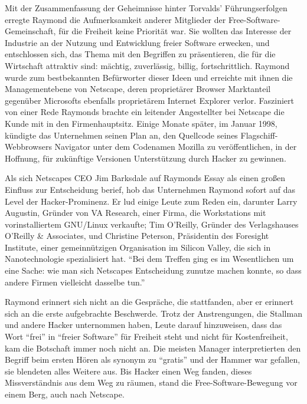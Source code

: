 Mit der Zusammenfassung der Geheimnisse hinter Torvalds' Führungserfolgen erregte Raymond die Aufmerksamkeit anderer Mitglieder der Free-Software-Gemeinschaft, für die Freiheit keine Priorität war. Sie wollten das Interesse der Industrie an der Nutzung und Entwicklung freier Software erwecken, und entschlossen sich, das Thema mit den Begriffen zu präsentieren, die für die Wirtschaft attraktiv sind: mächtig, zuverlässig, billig, fortschrittlich. Raymond wurde zum bestbekannten Befürworter dieser Ideen und erreichte mit ihnen die Managementebene von Netscape, deren proprietärer Browser Marktanteil gegenüber Microsofts ebenfalls proprietärem Internet Explorer verlor. Fasziniert von einer Rede Raymonds brachte ein leitender Angestellter bei Netscape die Kunde mit in den Firmenhauptsitz. Einige Monate später, im Januar 1998, kündigte das Unternehmen seinen Plan an, den Quellcode seines Flagschiff-Webbrowsers Navigator unter dem Codenamen Mozilla zu veröffentlichen, in der Hoffnung, für zukünftige Versionen Unterstützung durch Hacker zu gewinnen.

Als sich Netscapes CEO Jim Barksdale auf Raymonds Essay  als einen großen Einfluss zur Entscheidung berief, hob das Unternehmen Raymond sofort auf das Level der Hacker-Prominenz. Er lud einige Leute zum Reden ein, darunter Larry Augustin, Gründer von VA Research, einer Firma, die Workstations mit vorinstalliertem GNU/Linux verkaufte; Tim O'Reilly, Gründer des Verlagshauses O'Reilly \& Associates, und Christine Peterson, Präsidentin des Foresight Institute, einer gemeinnützigen Organisation im Silicon Valley, die sich in Nanotechnologie spezialisiert hat. "`Bei dem Treffen ging es im Wesentlichen um eine Sache: wie man sich Netscapes Entscheidung zunutze machen konnte, so dass andere Firmen vielleicht dasselbe tun."'

Raymond erinnert sich nicht an die Gespräche, die stattfanden, aber er erinnert sich an die erste aufgebrachte Beschwerde. Trotz der Anstrengungen, die Stallman und andere Hacker unternommen haben, Leute darauf hinzuweisen, dass das Wort "`frei"' in "`freier Software"' für Freiheit steht und nicht für Kostenfreiheit, kam die Botschaft immer noch nicht an. Die meisten Manager interpretierten den Begriff beim ersten Hören als synonym zu "`gratis"' und der Hammer war gefallen, sie blendeten alles Weitere aus. Bis Hacker einen Weg fanden, dieses Missverständnis aus dem Weg zu räumen, stand die Free-Software-Bewegung vor einem Berg, auch nach Netscape.

